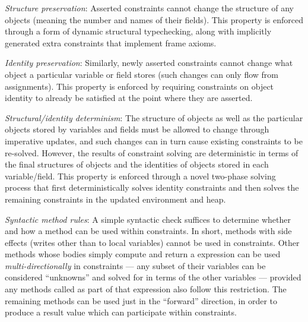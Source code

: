 \documentclass[10pt,reprint]{sigplanconf-preprint}
\begin{document}
\begin{itemize}
\begin{sloppypar}
\item {\em Structure preservation}: Asserted constraints cannot change
  the structure of any objects (meaning the number and names of their
  fields).  This property is enforced through a form of dynamic
  structural typechecking, along with implicitly generated extra
  constraints that implement frame axioms.
\end{sloppypar}

\item {\em Identity preservation}: Similarly, newly asserted
  constraints cannot change what object a particular variable or field
  stores (such changes can only flow from assignments).  This property
  is enforced by requiring constraints on object identity to already
  be satisfied at the point where they are asserted.

\item {\em Structural/identity determinism}:  The structure of objects
  as well as the particular objects stored by variables and fields
  must be allowed to change through imperative updates, and such
  changes can in turn cause existing constraints to be re-solved.
  However, the results of constraint solving are deterministic in
  terms of the final structures of objects and the identities of objects
  stored in each variable/field.  This
  property is enforced through a novel two-phase solving process that first
  deterministically solves identity constraints and then solves the remaining constraints in the
  updated environment and heap.

\item {\em Syntactic method rules}:  A simple syntactic check suffices
  to determine whether and how a method can be used within constraints.
  In short, methods with side effects (writes other than to local
  variables) cannot be used in constraints.  Other methods whose
  bodies simply compute and return a expression can be used
  {\em multi-directionally} in constraints --- any subset of their variables can be considered
``unknowns'' and solved for in terms of the other variables --- provided any methods called as part
  of that expression also follow this restriction. The remaining methods can
  be used just in the ``forward'' direction, in
  order to produce a result value which can participate within constraints.
\end{itemize}
\end{document}
